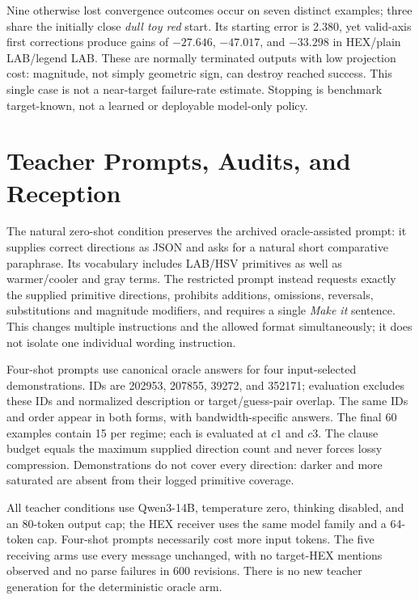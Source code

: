 Nine otherwise lost convergence outcomes occur on seven distinct examples;
three share the initially close \emph{dull toy red} start.
Its starting error is 2.380, yet valid-axis first corrections produce gains
of $-27.646$, $-47.017$, and $-33.298$ in HEX/plain LAB/legend LAB.
These are normally terminated outputs with low projection cost: magnitude,
not simply geometric sign, can destroy reached success. This single case
is not a near-target failure-rate estimate. Stopping is benchmark target-known,
not a learned or deployable model-only policy.

\section{Teacher Prompts, Audits, and Reception}
\label{app:teacher_controls}

The natural zero-shot condition preserves the archived oracle-assisted
prompt: it supplies correct directions as JSON and asks for a natural short
comparative paraphrase. Its vocabulary includes LAB/HSV primitives as well
as warmer/cooler and gray terms. The restricted prompt instead requests
exactly the supplied primitive directions, prohibits additions, omissions,
reversals, substitutions and magnitude modifiers, and requires a single
\emph{Make it} sentence. This changes multiple instructions and the allowed
format simultaneously; it does not isolate one individual wording instruction.

Four-shot prompts use canonical oracle answers for four input-selected
demonstrations. IDs are 202953, 207855, 39272, and 352171; evaluation excludes
these IDs and normalized description or target/guess-pair overlap. The same
IDs and order appear in both forms, with bandwidth-specific answers.
The final 60 examples contain 15 per regime; each is evaluated at $c1$ and
$c3$. The clause budget equals the maximum supplied direction count and
never forces lossy compression. Demonstrations do not cover every direction:
darker and more saturated are absent from their logged primitive coverage.

All teacher conditions use Qwen3-14B, temperature zero, thinking disabled,
and an 80-token output cap; the HEX receiver uses the same model family
and a 64-token cap. Four-shot prompts necessarily cost more input tokens.
The five receiving arms use every message unchanged, with no target-HEX
mentions observed and no parse failures in 600 revisions. There is no new
teacher generation for the deterministic oracle arm.

